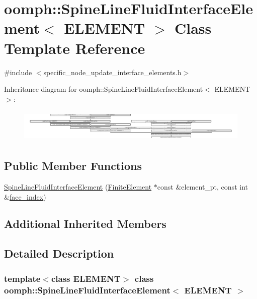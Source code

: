 \hypertarget{classoomph_1_1SpineLineFluidInterfaceElement}{}\section{oomph\+:\+:Spine\+Line\+Fluid\+Interface\+Element$<$ E\+L\+E\+M\+E\+NT $>$ Class Template Reference}
\label{classoomph_1_1SpineLineFluidInterfaceElement}


{\ttfamily \#include $<$specific\+\_\+node\+\_\+update\+\_\+interface\+\_\+elements.\+h$>$}

Inheritance diagram for oomph\+:\+:Spine\+Line\+Fluid\+Interface\+Element$<$ E\+L\+E\+M\+E\+NT $>$\+:\begin{figure}[H]
\begin{center}
\leavevmode
\includegraphics[height=1.583039cm]{classoomph_1_1SpineLineFluidInterfaceElement}
\end{center}
\end{figure}
\subsection*{Public Member Functions}
\begin{DoxyCompactItemize}
\item 
\hyperlink{classoomph_1_1SpineLineFluidInterfaceElement_aaafc180606b418920b0588532f8bfbec}{Spine\+Line\+Fluid\+Interface\+Element} (\hyperlink{classoomph_1_1FiniteElement}{Finite\+Element} $\ast$const \&element\+\_\+pt, const int \&\hyperlink{classoomph_1_1FaceElement_a478d577ac6db67ecc80f1f02ae3ab170}{face\+\_\+index})
\end{DoxyCompactItemize}
\subsection*{Additional Inherited Members}


\subsection{Detailed Description}
\subsubsection*{template$<$class E\+L\+E\+M\+E\+NT$>$\newline
class oomph\+::\+Spine\+Line\+Fluid\+Interface\+Element$<$ E\+L\+E\+M\+E\+N\+T $>$}



